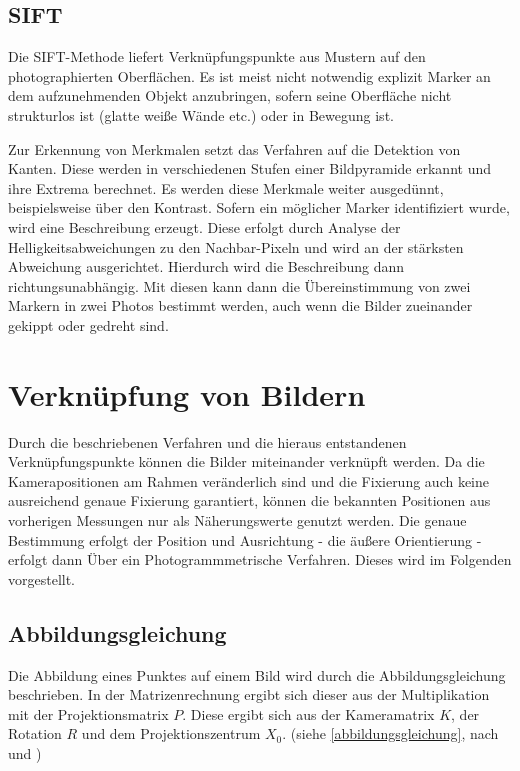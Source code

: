 \documentclass[./00PhotoBox.tex]{subfiles}
\begin{document}
\subsection{SIFT}
Die SIFT-Methode liefert Verknüpfungspunkte aus Mustern auf den photographierten Oberflächen. Es ist meist nicht notwendig explizit Marker an dem aufzunehmenden Objekt anzubringen, sofern seine Oberfläche nicht strukturlos ist (glatte weiße Wände etc.) oder in Bewegung ist.

Zur Erkennung von Merkmalen setzt das Verfahren auf die Detektion von Kanten. Diese werden in verschiedenen Stufen einer Bildpyramide erkannt und ihre Extrema berechnet. Es werden diese Merkmale weiter ausgedünnt, beispielsweise über den Kontrast. Sofern ein möglicher Marker identifiziert wurde, wird eine Beschreibung erzeugt. Diese erfolgt  durch Analyse der Helligkeitsabweichungen zu den Nachbar-Pixeln und wird an der stärksten Abweichung ausgerichtet. Hierdurch wird die Beschreibung dann richtungsunabhängig. Mit diesen kann dann die Übereinstimmung von zwei Markern in zwei Photos bestimmt werden, auch wenn die Bilder zueinander gekippt oder gedreht sind.
\citep[S. 484f]{luhmann}

\section{Verknüpfung von Bildern}
\label{s:photogramm}
Durch die beschriebenen Verfahren und die hieraus entstandenen Verknüpfungs\-punkte können die Bilder miteinander verknüpft werden. Da die Kamerapositionen am Rahmen veränderlich sind und die Fixierung auch keine ausreichend genaue Fixierung garantiert, können die bekannten Positionen aus vorherigen Messungen nur als Näherungswerte genutzt werden. Die genaue Bestimmung erfolgt der Position und Ausrichtung - die äußere Orientierung - erfolgt dann Über ein Photogrammmetrische Verfahren. Dieses wird im Folgenden vorgestellt.


\subsection{Abbildungsgleichung}
\label{ss:abbildungsgleichung}
Die Abbildung eines Punktes auf einem Bild wird durch die Abbildungsgleichung beschrieben. In der Matrizenrechnung ergibt sich dieser aus der Multiplikation mit der Projektionsmatrix $P$. Diese ergibt sich aus der Kameramatrix $K$, der Rotation $R$ und dem Projektionszentrum $X_0$. (siehe \autoref{abbildungsgleichung}, nach \citealp[S. 244]{hartley} und \citealp[S. 290]{luhmann})
\end{document}

